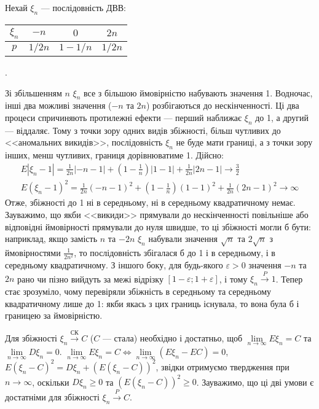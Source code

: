 \begin{example}
    Нехай $\xi_n$ --- послідовність ДВВ: 
        \begin{tabular}{|c|c|c|c|}
            \hline
            $\xi_n$ & $-n$ & $0$ & $2n$ \\
            \hline
            $p$ & $1/{2n}$ & $1 - 1/n$ & $1/{2n}$ \\
            \hline
        \end{tabular}.

    Зі збільшенням $n$ $\xi_n$ все з більшою ймовірністю набувають значення 1. 
    Водночас, інші два можливі значення ($-n$ та $2n$) розбігаються до нескінченності. 
    Ці два процеси спричиняють протилежні ефекти --- перший наближає $\xi_n$ до 1, а другий --- віддаляє. 
    Тому з точки зору одних видів збіжності, більш чутливих до <<аномальних викидів>>, послідовність $\xi_n$ не буде мати границі, 
    а з точки зору інших, менш чутливих, границя дорівнюватиме 1.
    Дійсно: 
    \begin{gather*}
        E\left|\xi_n -1 \right| = \frac{1}{2n} |-n-1|  + \left( 1 - \frac{1}{n}\right)|1-1| + \frac{1}{2n}|2n-1| \to \frac{3}{2} \\
        E\left(\xi_n -1 \right)^2 = \frac{1}{2n} (-n-1)^2  + \left( 1 - \frac{1}{n}\right)(1-1)^2 + \frac{1}{2n}(2n-1)^2 \to \infty
    \end{gather*}
    Отже, збіжності до 1 ні в середньому, ні в середньому квадратичному немає. Зауважимо, що якби <<викиди>> прямували до нескінченності повільніше або відповідні
    ймовірності прямували до нуля швидше, то ці збіжності могли б бути: наприклад, якщо замість $n$ та $-2n$ $\xi_n$ набували значення $\sqrt{n}$ та $2\sqrt{n}$
    з ймовірностями $\frac{1}{2n^2}$, то послідовність збігалася б до 1 і в середньому, і в середньому квадратичному.
    З іншого боку, для будь-якого $\varepsilon>0$ значення $-n$ та $2n$ рано чи пізно вийдуть за межі відрізку $[1-\varepsilon;1+\varepsilon]$, і тому
    $\xi_n \overset{P}{\longrightarrow} 1$. Тепер стає зрозуміло, чому перевіряли збіжність в середньому та середньому квадратичному лише до 1: якби
    якась з цих границь існувала, то вона була б і границею за ймовірністю.
\end{example}
\begin{remark}Для збіжності $\xi_n \overset{\text{СК}}{\longrightarrow} C$ ($C$ --- стала) необхідно і достатньо, щоб
$\underset{n \to \infty}{\lim} E\xi_n = C$ та $\underset{n \to \infty}{\lim} D\xi_n = 0$.
$\underset{n \to \infty}{\lim} E\xi_n = C \Leftrightarrow \underset{n \to \infty}{\lim} (E\xi_n - EC) = 0$,
$E(\xi_n - C)^2 = D\xi_n + (E(\xi_n -C))^2$,
звідки отримуємо твердження при $n \to \infty$, оскільки $D\xi_n \geq 0$ та $(E(\xi_n -C))^2 \geq 0$.
Зауважимо, що ці дві умови є достатніми для збіжності $\xi_n \overset{P}{\longrightarrow} C$.
\end{remark}
